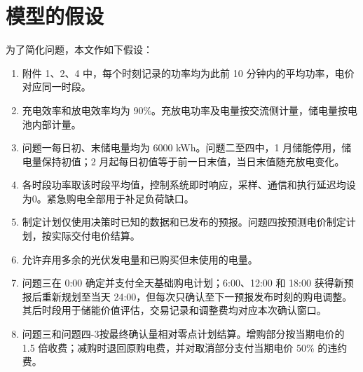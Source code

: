 \section{模型的假设}
为了简化问题，本文作如下假设：
\begin{enumerate}[label=\textbf{假设\arabic*：},leftmargin=4.5em,labelsep=0.4em,itemsep=0.3em]
    \item 附件 1、2、4 中，每个时刻记录的功率均为此前 10 分钟内的平均功率，电价对应同一时段。
    \item 充电效率和放电效率均为 90\%。充放电功率及电量按交流侧计量，储电量按电池内部计量。
    \item 问题一每日初、末储电量均为 6000 kWh。问题二至四中，1 月储能停用，储电量保持初值；2 月起每日初值等于前一日末值，当日末值随充放电变化。
    \item 各时段功率取该时段平均值，控制系统即时响应，采样、通信和执行延迟均设为0。紧急购电全部用于补足负荷缺口。
    \item 制定计划仅使用决策时已知的数据和已发布的预报。问题四按预测电价制定计划，按实际交付电价结算。
    \item 允许弃用多余的光伏发电量和已购买但未使用的电量。
    \item 问题三在 0:00 确定并支付全天基础购电计划；6:00、12:00 和 18:00 获得新预报后重新规划至当天 24:00，但每次只确认至下一预报发布时刻的购电调整。其后时段用于储能价值评估，交易记录和调整费均对应本次确认窗口。
    \item 问题三和问题四-3按最终确认量相对零点计划结算。增购部分按当期电价的 1.5 倍收费；减购时退回原购电费，并对取消部分支付当期电价 50\% 的违约费。
\end{enumerate}
